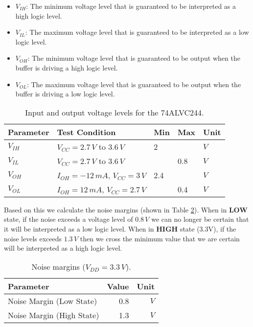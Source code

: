 \documentclass[../main.tex]{subfiles}
\begin{document}
\begin{itemize}
    \item $V_{IH}$: The minimum voltage level that is guaranteed to be interpreted as a high logic level.
    \item $V_{IL}$: The maximum voltage level that is guaranteed to be interpreted as a low logic level.
    \item $V_{OH}$: The minimum voltage level that is guaranteed to be output when the buffer is driving a high logic level.
    \item $V_{OL}$: The maximum voltage level that is guaranteed to be output when the buffer is driving a low logic level.
\end{itemize}

\begin{table}[h]
    \centering
    \begin{tabular}{l|l|lll}
        \toprule[1pt]
        \textbf{Parameter} & \textbf{Test Condition} & \textbf{Min} & \textbf{Max} & \textbf{Unit} \\
        \midrule
        $V_{IH}$ & $V_{CC} = 2.7\,\si{V}$ to $3.6\,\si{V}$ & 2 &     & $\si{V}$ \\
        $V_{IL}$ & $V_{CC} = 2.7\,\si{V}$ to $3.6\,\si{V}$ &   & 0.8 & $\si{V}$ \\
        $V_{OH}$ & $I_{OH} = -12\,\si{mA}$, $V_{CC} = 3\,\si{V}$& 2.4&&$\si{V}$ \\
        $V_{OL}$ & $I_{OH} = 12\,\si{mA}$, $V_{CC} = 2.7\,\si{V}$&&0.4&$\si{V}$ \\
        \bottomrule[1pt]
    \end{tabular}
    \caption{Input and output voltage levels for the 74ALVC244.}
    \label{tab:io-levels}
\end{table}

Based on this we calculate the noise margins (shown in Table \ref{tab:noise-margin}). When in \textbf{LOW} state, if the noise exceeds a voltage level of $0.8\,\si{V}$ we can no longer be certain that it will be interpreted as a low logic level. When in \textbf{HIGH} state (3.3V), if the noise levels exceeds $1.3\,\si{V}$ then we cross the minimum value that we are certain will be interpreted as a high logic level.

\newpage

\begin{table}[h]
    \centering
    \begin{tabular}{l|r r}
        \toprule[1pt]
        \textbf{Parameter} & \textbf{Value} & \textbf{Unit} \\
        \midrule
        Noise Margin (Low State)  & 0.8 & $\si{V}$ \\
        Noise Margin (High State) & 1.3 & $\si{V}$ \\
        \bottomrule[1pt]
    \end{tabular}
    \caption{Noise margins ($V_{DD} = 3.3\,\si{V}$).}
    \label{tab:noise-margin}
\end{table}
\end{document}
